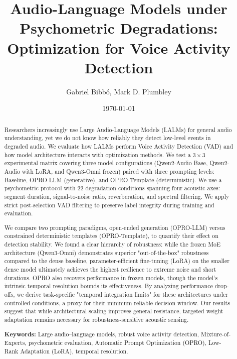 \documentclass[11pt,a4paper]{article}
\begin{document}
\title{Audio-Language Models under Psychometric Degradations: Optimization for Voice Activity Detection}
\author{Gabriel Bibbó, Mark D. Plumbley}
\date{\today}
\maketitle

\begin{abstract}
Researchers increasingly use Large Audio-Language Models (LALMs) for general audio understanding, yet we do not know how reliably they detect low-level events in degraded audio. We evaluate how LALMs perform Voice Activity Detection (VAD) and how model architecture interacts with optimization methods. We test a $3 \times 3$ experimental matrix covering three model configurations (Qwen2-Audio Base, Qwen2-Audio with LoRA, and Qwen3-Omni frozen) paired with three prompting levels: Baseline, OPRO-LLM (generative), and OPRO-Template (deterministic). We use a psychometric protocol with 22 degradation conditions spanning four acoustic axes:
segment duration, signal-to-noise ratio, reverberation, and spectral filtering. We apply strict post-selection VAD filtering to preserve label integrity during training and evaluation.

We compare two prompting paradigms, open-ended generation (OPRO-LLM) versus constrained deterministic templates (OPRO-Template), to quantify their effect on detection stability. We found a clear hierarchy of robustness: while the frozen MoE architecture (Qwen3-Omni) demonstrates superior "out-of-the-box" robustness compared to the dense baseline, parameter-efficient fine-tuning (LoRA) on the smaller dense model ultimately achieves the highest resilience to extreme noise and short durations. OPRO also recovers performance in frozen models, though the model's intrinsic temporal resolution bounds its effectiveness. By analyzing performance drop-offs, we derive task-specific "temporal integration limits" for these architectures under controlled conditions, a proxy for their minimum reliable decision window. Our results suggest that while architectural scaling improves general resistance, targeted weight adaptation remains necessary for robustness-sensitive acoustic sensing.

\noindent\textbf{Keywords:}
Large audio--language models,
robust voice activity detection,
Mixture-of-Experts,
psychometric evaluation,
Automatic Prompt Optimization (OPRO),
Low-Rank Adaptation (LoRA),
temporal resolution.
\end{abstract}
\end{document}
